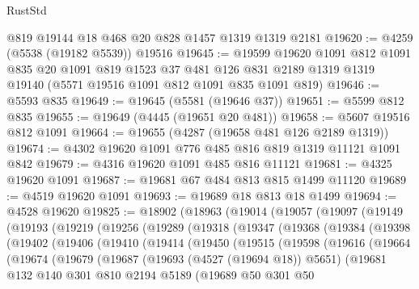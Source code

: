 \begin{lexlean}{RustStd}
\begin{coremodule}
{\begin{coremodule}
{{{{{{{{{{{{{{{{{{{{{{{{{{{{{{{{{{{{{{    @819
    @19144
    @18
    @468
    @20
    @828
    @1457
    @1319
    @1319
    @2181
@19620 := @4259 (@5538 (@19182 @5539)) @19516
@19645 := @19599
    @19620
    @1091
    @812
    @1091
    @835
    @20
    @1091
    @819
    @1523
    @37
    @481
    @126
    @831
    @2189
    @1319
    @1319
    @19140
    (@5571 @19516 @1091 @812 @1091 @835 @1091 @819)
@19646 := @5593 @835
@19649 := @19645 (@5581 (@19646 @37))
@19651 := @5599 @812 @835
@19655 := @19649 (@4445 (@19651 @20 @481))
@19658 := @5607 @19516 @812 @1091
@19664 := @19655 (@4287 (@19658 @481 @126 @2189 @1319))
@19674 := @4302 @19620 @1091 @776 @485 @816 @819 @1319 @11121 @1091 @842
@19679 := @4316 @19620 @1091 @485 @816 @11121
@19681 := @4325 @19620 @1091
@19687 := @19681 @67 @484 @813 @815 @1499 @11120
@19689 := @4519 @19620 @1091
@19693 := @19689 @18 @813 @18 @1499
@19694 := @4528 @19620
@19825 := @18902
    (@18963
      (@19014
        (@19057
          (@19097
            (@19149
              (@19193
                (@19219
                  (@19256
                    (@19289
                      (@19318
                        (@19347
                          (@19368
                            (@19384
                              (@19398
                                (@19402
                                  (@19406
                                    (@19410
                                      (@19414
                                        (@19450
                                          (@19515
                                            (@19598
                                              (@19616
                                                (@19664
                                                  (@19674
                                                    (@19679
                                                      (@19687
                                                        (@19693 (@4527 (@19694 @18)) @5651)
                                                        (@19681
                                                          @132
                                                          @140
                                                          @301
                                                          @810
                                                          @2194
                                                          @5189
                                                          (@19689
                                                            @50
                                                            @301
                                                            @50
}}}}}}}}}}}}}}}}}}}}}}}}}}}}}}}}}}}}}}
\end{coremodule}}
\end{coremodule}
\end{lexlean}
